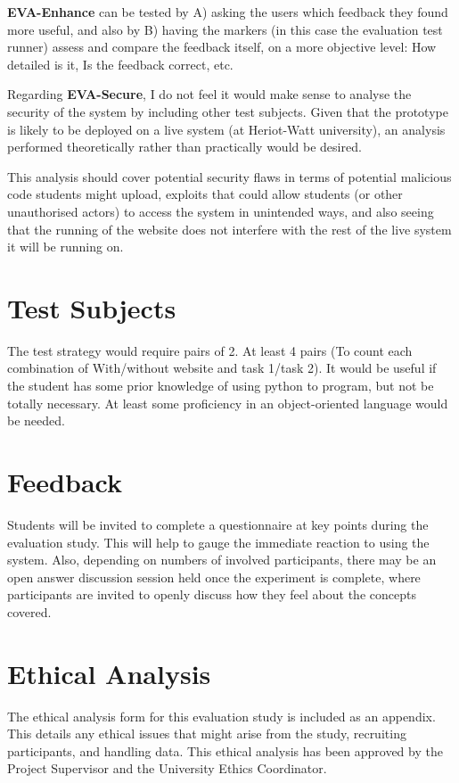 \documentclass[a4paper,11pt]{report}
\begin{document}
\textbf{EVA-Enhance} can be tested by A) asking the users which feedback they found more useful, and also by B) having the markers (in this case the evaluation test runner) assess and compare the feedback itself, on a more objective level: How detailed is it, Is the feedback correct, etc.\par
Regarding \textbf{EVA-Secure}, I do not feel it would make sense to analyse the security of the system by including other test subjects. Given that the prototype is likely to be deployed on a live system (at Heriot-Watt university), an analysis performed theoretically rather than practically would be desired.\par
This analysis should cover potential security flaws in terms of potential malicious code students might upload, exploits that could allow students (or other unauthorised actors) to access the system in unintended ways, and also seeing that the running of the website does not interfere with the rest of the live system it will be running on.

\section{Test Subjects}
The test strategy would require pairs of 2. At least 4 pairs (To count each combination of With/without website and task 1/task 2). It would be useful if the student has some prior knowledge of using python to program, but not be totally necessary. At least some proficiency in an object-oriented language would be needed.

\section{Feedback}
Students will be invited to complete a questionnaire at key points during the evaluation study. This will help to gauge the immediate reaction to using the system. Also, depending on numbers of involved participants, there may be an open answer discussion session held once the experiment is complete, where participants are invited to openly discuss how they feel about the concepts covered.

\section{Ethical Analysis}
The ethical analysis form for this evaluation study is included as an appendix. This details any ethical issues that might arise from the study, recruiting participants, and handling data. This ethical analysis has been approved by the Project Supervisor and the University Ethics Coordinator.
\end{document}
